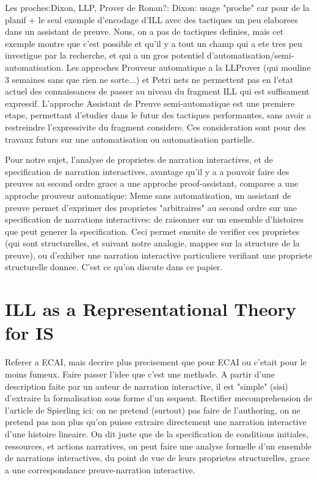 \documentclass[runningheads,a4paper]{llncs}
\begin{document}
Les proches:Dixon, LLP, Prover de Ronan?: 
Dixon: usage "proche" car pour de la planif + le seul exemple d'encodage d'ILL avec des tactiques un peu elaborees dans un assistant de preuve. Nous, on a pas de tactiques definies, mais cet exemple montre que c'est possible et qu'il y a tout un champ qui a ete tres peu investigue par la recherche, et qui a un gros potentiel d'automatisation/semi-automatisation. Les approches Prouveur automatique  a la LLProver (qui mouline 3 semaines sans que rien ne sorte...) et Petri nets ne permettent pas en l'etat actuel des connaissances de passer au niveau du fragment ILL qui est suffisament expressif. L'approche Assistant de Preuve semi-automatique est une premiere etape, permettant d'etudier dans le futur des tactiques performantes, sans avoir a restreindre l'expressivite du fragment considere. Ces consideration sont pour des travaux futurs sur une automatisation ou automatisation partielle.

Pour notre sujet, l'analyse de proprietes de narration interactives, et de specification de narration interactives, avantage qu'il y a a pouvoir faire des preuves au second ordre grace a une approche proof-assistant, comparee a une approche prouveur automatique: Meme sans automatisation, un assistant de preuve permet d'exprimer des proprietes "arbitraires" au second ordre sur une specification de narrations interactives: de raisonner sur un ensemble d'histoires que peut generer la specification. Ceci permet ensuite de verifier ces proprietes (qui sont structurelles, et suivant notre analogie, mappee sur la structure de la preuve), ou d'exhiber une narration interactive particuliere verifiant une propriete structurelle donnee. C'est ce qu'on discute dans ce papier.
\section{ILL as a Representational Theory for IS}
Referer a ECAI, mais decrire plus precisement que pour ECAI ou c'etait pour le moins fumeux. Faire passer l'idee que c'est une methode. A partir d'une description faite par un auteur de narration interactive, il est "simple" (sisi) d'extraire la formalisation sous forme d'un sequent. Rectifier mecomprehension de l'article de Spierling ici: on ne pretend (surtout) pas faire de l'authoring, on ne pretend pas non plus qu'on puisse extraire directement une narration interactive d'une histoire lineaire. On dit juste que de la specification de conditions initiales, ressources, et actions narratives, on peut faire une analyse formelle d'un ensemble de narrations interactives, du point de vue de leurs proprietes structurelles, grace a une correspondance preuve-narration interactive. 
\end{document}
